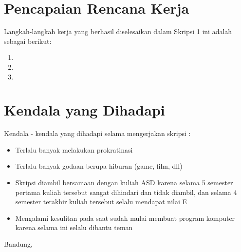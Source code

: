 \documentclass[a4paper,twoside]{article}
\begin{document}
\section{Pencapaian Rencana Kerja}
Langkah-langkah kerja yang berhasil diselesaikan dalam Skripsi 1 ini adalah sebagai berikut:
\begin{enumerate}
\item
\item
\item
\end{enumerate}



\section{Kendala yang Dihadapi}
Kendala - kendala yang dihadapi selama mengerjakan skripsi :
\begin{itemize}
	\item Terlalu banyak melakukan prokratinasi
	\item Terlalu banyak godaan berupa hiburan (game, film, dll)
	\item Skripsi diambil bersamaan dengan kuliah ASD karena selama 5 semester pertama kuliah tersebut sangat dihindari dan tidak diambil, dan selama 4 semester terakhir kuliah tersebut selalu mendapat nilai E
	\item Mengalami kesulitan pada saat sudah mulai membuat program komputer karena selama ini selalu dibantu teman
\end{itemize}

\vspace{1cm}
\centering Bandung, \tanggal\\
\vspace{2cm} \nama \\ 
\vspace{1cm}
\end{document}
